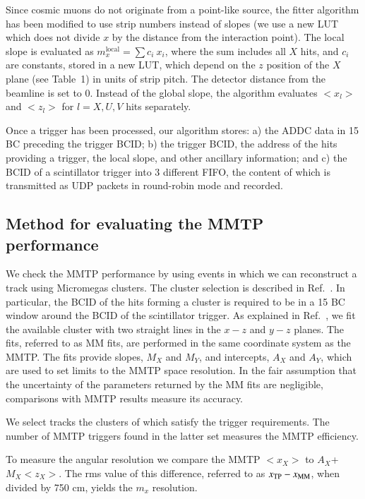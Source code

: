 Since cosmic muons do not originate from a point-like source, the fitter algorithm has been modified to use strip numbers instead of slopes
(we use a new LUT which does not divide $x$ by the distance from the interaction point).
The local slope is evaluated as    $m_x^\text{local} = \sum c_i \ x_i$, where the sum includes all $X$ hits, and $c_i$ are constants,
stored in a new LUT, which depend on the $z$ position of the $X$ plane (see Table~1) in units of strip pitch. 
 The detector distance from the beamline is set to 0.
 Instead of the global slope, the algorithm evaluates $<x_l>$ and $<z_l>$ for $l=X,U,V$ hits separately.

 Once a trigger has been processed, our algorithm stores: a) the ADDC data in 15 BC preceding the trigger BCID; b) the trigger BCID, the address of the hits
 providing a trigger, the local slope, and other ancillary information; and c) the BCID of a scintillator trigger into 3 different FIFO,
 the content of which is transmitted as UDP packets
 in round-robin mode and recorded.
 
\subsection{Method for evaluating the MMTP performance}
\label{sec:alg-resol}

 We check the MMTP performance by using events in which we can reconstruct a track using Micromegas clusters.
 The cluster selection is described in Ref.~\cite{noisy}. In particular, the  BCID of the hits forming a cluster is required
 to be in a 15 BC window around the BCID of the scintillator trigger.
 As explained in Ref.~\cite{noisy}, we fit the available cluster with two straight lines in the $x-z$ and $y-z$ planes.
 The fits, referred to as MM fits, are performed in the same coordinate system as the MMTP. The fits provide slopes, $M_X$ and $M_Y$, and intercepts, $A_X$ and $A_Y$,
 which are used to set limits to the MMTP space resolution. In the fair assumption that the uncertainty of the parameters returned by the MM fits 
  are negligible,  comparisons with MMTP results measure its accuracy.

  We select tracks the clusters of which satisfy the trigger requirements. The number of MMTP triggers found in the latter
 set measures the MMTP efficiency.

 To measure the angular resolution  we compare the MMTP $<x_X>$  to  $A_X$+ $M_X <z_X>$.
  The rms value of this difference, referred to as  $x_{\rm TP}-x_{\rm MM}$,
  when divided by 750 cm, yields the $m_x$ resolution.

